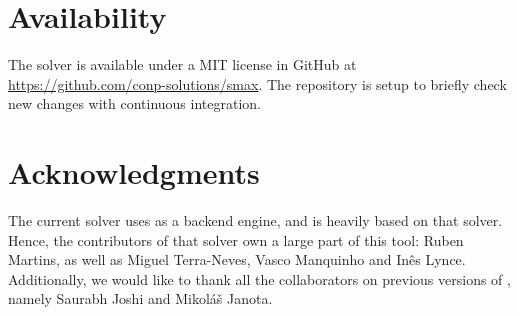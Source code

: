 \documentclass[conference]{IEEEtran}
\begin{document}
\section{Availability}

The solver \smax is available under a MIT license in GitHub at \url{https://github.com/conp-solutions/smax}.
The repository is setup to briefly check new changes with continuous integration.

\section*{Acknowledgments}

The current solver uses \openwbo as a backend engine, and is heavily based on that solver.
Hence, the contributors of that solver own a large part of this tool: Ruben Martins, as well as Miguel Terra-Neves, Vasco Manquinho and In\^es Lynce.
Additionally, we would like to thank all the collaborators on previous versions of \openwbo, namely Saurabh Joshi and Mikol{\'a}{\v{s}} Janota. 

\balance


\end{document}
